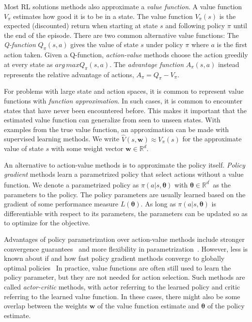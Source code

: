 Most RL solutions methods also approximate a \textit{value function}.
A value function \(V_\pi\) estimates how good it is to be in a state.
The value function \(V_\pi(s)\) is the expected (discounted) return when starting at state \(s\) and following policy \(\pi\) until the end of the episode.
There are two common alternative value functions:
The \textit{Q-function} \(Q_\pi(s,a)\) gives the value of state \(s\) under policy \(\pi\) where \(a\) is the first action taken.
Given a Q-function, \textit{action-value} methods choose the action greedily at every state as \(arg\,max Q_\pi(s, a)\).
The \textit{advantage function} \(A_\pi(s, a)\) instead represents the relative advantage of actions, \(A_\pi = Q_\pi - V_\pi\).~\cite{sutton_reinforcement_2018}

For problems with large state and action spaces, it is common to represent value functions with \textit{function approximation}.
In such cases, it is common to encounter states that have never been encountered before.
This makes it important that the estimated value function can generalize from seen to unseen states.
With examples from the true value function, an approximation can be made with supervised learning methods.
We write \(\hat{V}(s,\mathbf{w}) \approx V_\pi(s)\) for the approximate value of state \(s\) with some weight vector \(\mathbf{w} \in \mathbb{R}^d\).~\cite{sutton_reinforcement_2018}

An alternative to action-value methods is to approximate the policy itself.
\textit{Policy gradient} methods learn a parametrized policy that select actions without a value function.
We denote a parametrized policy as \(\pi(a|s,\boldsymbol{\theta})\) with \(\boldsymbol{\theta} \in \mathbb{R}^{d^\prime}\) as the parameters to the policy.
The policy parameters are usually learned based on the gradient of some performance measure \(L(\boldsymbol{\theta})\).
As long as \(\pi(a|s,\boldsymbol{\theta})\) is differentiable with respect to its parameters, the parameters can be updated so as to optimize for the objective.~\cite{sutton_policy_1999}

Advantages of policy parametrization over action-value methods include stronger convergence guarantees~\cite{sutton_policy_1999} and more flexibility in parametrization~\cite{sutton_reinforcement_2018}.
However, less is known about if and how fast policy gradient methods converge to globally optimal policies~\cite{agarwal_optimality_2020}
In practice, value functions are often still used to learn the policy parameter, but they are not needed for action selection.
Such methods are called \textit{actor-critic} methods, with actor referring to the learned policy and critic referring to the learned value function.
In these cases, there might also be some overlap between the weights \(\mathbf{w}\) of the value function estimate and \(\boldsymbol{\theta}\) of the policy estimate. 

